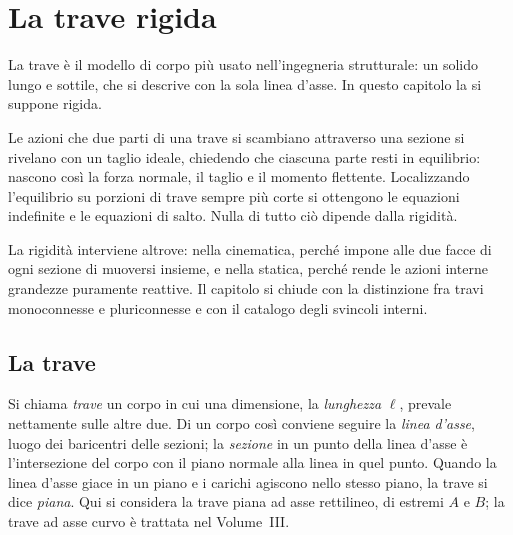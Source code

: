 \graphicspath{{Parti/P04-Travi_rigide/P04-Travi_rigide/Figure/}}
\chapter{La trave rigida}\label{cap:Trave_Rigida}

\begin{sommario}
	La trave è il modello di corpo più usato nell'ingegneria
	strutturale: un solido lungo e sottile, che si descrive
	con la sola linea d'asse. In questo capitolo la si
	suppone rigida.
	
	Le azioni che due parti di una trave si scambiano
	attraverso una sezione si rivelano con un taglio ideale,
	chiedendo che ciascuna parte resti in equilibrio: nascono
	così la forza normale, il taglio e il momento flettente.
	Localizzando l'equilibrio su porzioni di trave sempre più
	corte si ottengono le equazioni indefinite e le equazioni
	di salto. Nulla di tutto ciò dipende dalla rigidità.
	
	La rigidità interviene altrove: nella cinematica, perché
	impone alle due facce di ogni sezione di muoversi insieme,
	e nella statica, perché rende le azioni interne grandezze
	puramente reattive. Il capitolo si chiude con la
	distinzione fra travi monoconnesse e pluriconnesse e con
	il catalogo degli svincoli interni.
\end{sommario}



\section{La trave}
\label{sec:trave_def}

Si chiama \emph{trave} un corpo in
cui una dimensione, la \emph{lunghezza} $\ell$, prevale
nettamente sulle altre due. Di un corpo così conviene
seguire la \emph{linea d'asse},
luogo dei baricentri delle sezioni; la
\emph{sezione} in un
punto della linea d'asse è l'intersezione del corpo con
il piano normale alla linea in quel punto. Quando la
linea d'asse giace in un piano e i carichi agiscono
nello stesso piano, la trave si dice
\emph{piana}. Qui si considera
la trave piana ad asse rettilineo, di estremi $A$ e $B$;
la trave ad asse curvo è trattata nel Volume~III.

